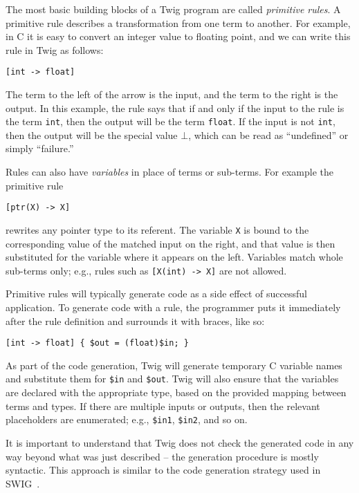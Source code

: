 The most basic building blocks of a Twig program are called
\emph{primitive rules}. A primitive rule describes a transformation
from one term to another.  For example, in C it is easy to convert an
integer value to floating point, and we can write this rule in Twig as
follows:

\begin{verbatim}
[int -> float]
\end{verbatim}

The term to the left of the arrow is the input, and the term to the right is the
output. In this example, the rule says that if and only if the input to the rule
is the term \texttt{int}, then the output will be the term \texttt{float}. If
the input is not \texttt{int}, then the output will be the special value $\bot$,
which can be read as ``undefined'' or simply ``failure.''

Rules can also have \emph{variables} in place of terms or sub-terms. For
example the primitive rule

\begin{verbatim}
[ptr(X) -> X]
\end{verbatim}

rewrites any pointer type to its referent. The variable \texttt{X} is bound to
the corresponding value of the matched input on the right, and that value is
then substituted for the variable where it appears on the left. Variables match
whole sub-terms only; e.g., rules such as \texttt{[X(int) -> X]} are not
allowed.

Primitive rules will typically generate code as a side effect of successful
application. To generate code with a rule, the programmer puts it immediately
after the rule definition and surrounds it with braces, like so:

\begin{verbatim}
[int -> float] { $out = (float)$in; }
\end{verbatim}

As part of the code generation, Twig will generate temporary C variable names
and substitute them for \texttt{\$in} and \texttt{\$out}. Twig will also ensure
that the variables are declared with the appropriate type, based on the provided
mapping between terms and types. If there are multiple inputs or outputs, then
the relevant placeholders are enumerated; e.g., \texttt{\$in1}, \texttt{\$in2},
and so on.

It is important to understand that Twig does not check the generated code in any
way beyond what was just described -- the generation procedure is mostly
syntactic. This approach is similar to the code generation strategy used in
SWIG~\cite{swig}.

